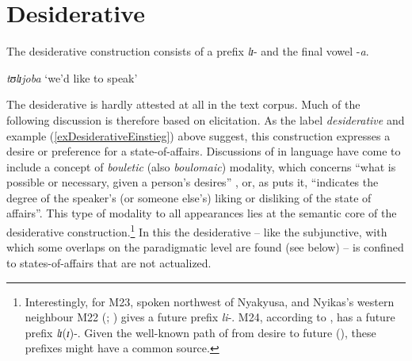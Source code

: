 \section{Desiderative}
\label{Desiderative}
The desiderative construction consists of a prefix \textit{lɪ}- and the final vowel -\textit{a}.

\begin{exe}
\ex \label{exDesiderativeEinstieg}\textit{tʊlɪjoba} `we'd like to speak'
\end{exe}
The desiderative is hardly attested at all in the text corpus. Much of the following discussion is therefore based on elicitation. As the label \textit{desiderative} and example (\ref{exDesiderativeEinstieg}) above suggest, this construction expresses a desire or preference for a state-of-affairs. Discussions of  in language have come to include a concept of \textit{bouletic} (also \textit{boulomaic}) modality, which concerns ``what is possible or necessary, given a person's desires'' \citep[2]{vonFintelK2006}, or, as \citet[12]{NuytsJ2005a} puts it, ``indicates the degree of the speaker's (or someone else's) liking or disliking of the state of affairs''. This type of modality to all appearances lies at the semantic core of the desiderative construction.\footnote{Interestingly, for  M23, spoken northwest of Nyakyusa, and Nyikas's western neighbour  M22 \citeauthor{BusseJ1940} (\citeyear[70]{BusseJ1940}; \citeyear[45]{BusseJ1960}) gives a future prefix \textit{li}-.  M24, according to \citet[85]{KutschLojengaC2007}, has a future prefix \textit{lɪ}(\textit{ɪ})-. Given the well-known path of  from desire to future (\citealt{BybeePerkinsPaglucia1994}), these prefixes might have a common source.} In this the desiderative -- like the subjunctive, with which some overlaps on the paradigmatic level are found (see below) -- is confined to states-of-affairs that are not actualized.

